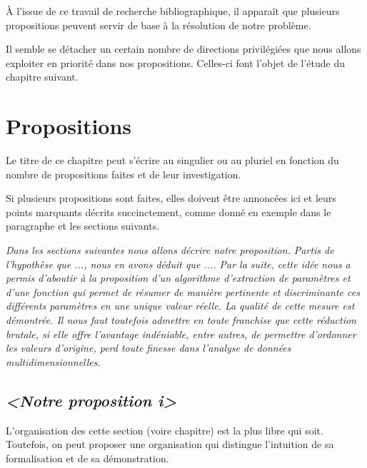 \documentclass[11pt, french]{report-rd-info}
\begin{document}
À l'issue de ce travail de recherche bibliographique, il apparaît que plusieurs propositions peuvent servir de base à la résolution de notre problème.

Il semble se détacher un certain nombre de directions privilégiées que nous allons exploiter en priorité dans nos propositions. Celles-ci font l'objet de l'étude du chapitre suivant.



\chapter{Propositions}
\label{chap:Propositions}

Le titre de ce chapitre peut s'écrire au singulier ou au pluriel en fonction du nombre de propositions faites et de leur investigation.

Si plusieurs propositions sont faites, elles doivent être annoncées ici et leurs points marquants décrits succinctement, comme donné en exemple dans le paragraphe et les sections suivants.

\bigskip

\emph{Dans les sections suivantes nous allons décrire notre proposition. Partis de l'hypothèse que ..., nous en avons déduit que .... Par la suite, cette idée nous a permis d'aboutir à la proposition d'un algorithme d'extraction de paramètres et d'une fonction qui permet de résumer de manière pertinente et discriminante ces différents paramètres en une unique valeur réelle. La qualité de cette mesure est démontrée. Il nous faut toutefois admettre en toute franchise que cette réduction brutale, si elle offre l'avantage indéniable, entre autres, de permettre d'ordonner les valeurs d'origine, perd toute finesse dans l'analyse de données multidimensionnelles.}

\section{\emph{<Notre proposition \textit{i}>}}

L'organisation des cette section (voire chapitre) est la plus libre qui soit. Toutefois, on peut proposer une organisation qui distingue l'intuition de sa formalisation et de sa démonstration.
\end{document}
